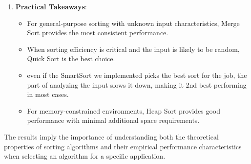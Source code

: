 \documentclass[a4paper,12pt]{article}
\begin{document}
\begin{enumerate}
\item \textbf{Practical Takeaways}:
\begin{itemize}
\item For general-purpose sorting with unknown input characteristics, Merge Sort provides the most consistent performance.
\item When sorting efficiency is critical and the input is likely to be random, Quick Sort is the best choice.
\item even if the SmartSort we implemented picks the best sort for the job, the part of analyzing the input slows it down, making it 2nd best performing in most cases.
\item For memory-constrained environments, Heap Sort provides good performance with minimal additional space requirements.
\end{itemize}
\end{enumerate}

The results imply the importance of understanding both the theoretical properties of sorting algorithms and their empirical performance characteristics when selecting an algorithm for a specific application.
\end{document}
